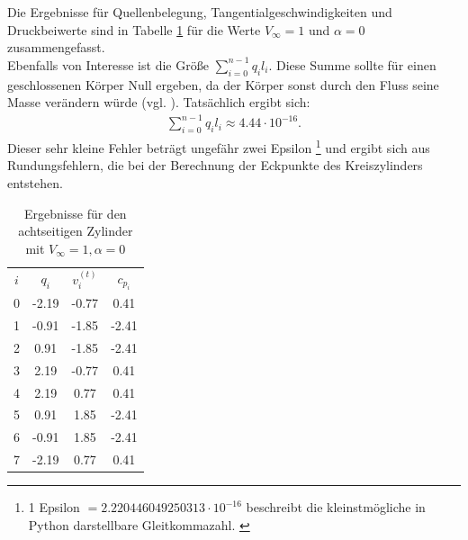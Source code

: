 Die Ergebnisse für Quellenbelegung, Tangentialgeschwindigkeiten und Druckbeiwerte sind in Tabelle \ref{tab:cyl8} für die Werte $V_{\infty} = 1$ und $\alpha  = 0$ zusammengefasst. \\
Ebenfalls von Interesse ist die Größe $\sum_{i=0}^{n-1} q_i l_i$. Diese Summe sollte für einen geschlossenen Körper Null ergeben, da der Körper sonst durch den Fluss seine Masse verändern würde (vgl. \cite{Barba:2019}). Tatsächlich ergibt sich:
\begin{align*}
\sum_{i=0}^{n-1} q_i l_i \approx 4.44 \cdot 10^{-16}.
\end{align*}
Dieser sehr kleine Fehler beträgt ungefähr zwei Epsilon \footnote{1 Epsilon $=2.220446049250313 \cdot 10^{-16}$ beschreibt die kleinstmögliche in Python darstellbare Gleitkommazahl.  \cite{python2009}} und ergibt sich aus Rundungsfehlern, die bei der Berechnung der Eckpunkte des Kreiszylinders entstehen.

\begin{table}
\caption{Ergebnisse für den achtseitigen Zylinder mit $V_{\infty} = 1, \alpha  = 0$}
\label{tab:cyl8}
\begin{center}
\begin{tabular}{c|ccc}
$i$ & $q_i$ & $v_i^{(t)}$ & $c_{p_i}$ \\
0 & -2.19 & -0.77 & 0.41 \\
1 & -0.91 & -1.85 & -2.41 \\
2 & 0.91 & -1.85 & -2.41 \\
3 & 2.19 & -0.77 & 0.41 \\
4 & 2.19 & 0.77 &  0.41 \\ 
5 &  0.91 & 1.85 & -2.41 \\
6 & -0.91 & 1.85 & -2.41 \\
7 & -2.19 &0.77 & 0.41
\end{tabular}
\end{center}
\end{table}

